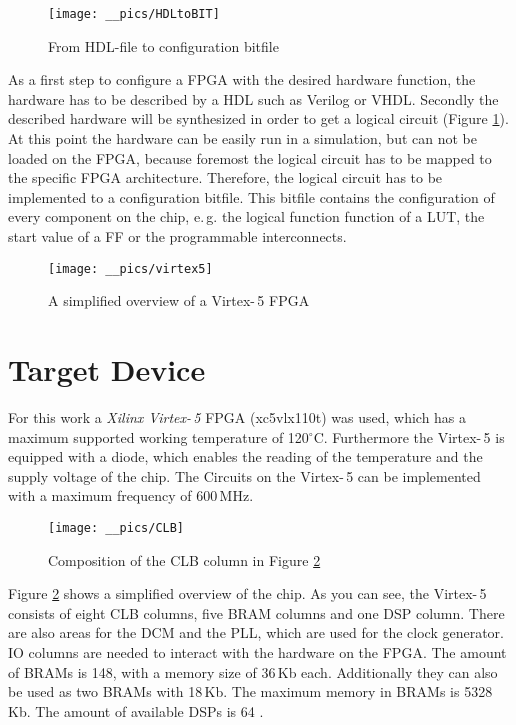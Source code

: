 \begin{figure}[h]
		\texttt{[image: \_\_pics/HDLtoBIT]}
		\caption{From HDL-file to configuration bitfile}
		\label{pic:hdltobit}	
	\end{figure} 

As a first step to configure a \ac{FPGA} with the desired hardware function, the hardware has to be described by a \ac{HDL} such as Verilog or \ac{VHDL}. Secondly the described hardware will be synthesized in order to get a logical circuit (Figure \ref{pic:hdltobit}). At this point the hardware can be easily run in a simulation, but can not be loaded on the \ac{FPGA}, because foremost the logical circuit has to be mapped to the specific \ac{FPGA} architecture. Therefore, the logical circuit has to be implemented to a configuration bitfile. This bitfile contains the configuration of every component on the chip, e.\,g. the logical function function of a \ac{LUT}, the start value of a \ac{FF} or the programmable interconnects.

\begin{figure}[h]
		\texttt{[image: \_\_pics/virtex5]}
		\caption{A simplified overview of a Virtex-\,5 FPGA}
		\label{pic:virtex5}	
	\end{figure} 


\section{Target Device}
\label{sec:target}
For this work a \textit{Xilinx Virtex-\,5} \ac{FPGA} (xc5vlx110t) was used, which has a maximum supported working temperature of 120$^{\circ}$C. Furthermore the Virtex-\,5 is equipped with a diode, which enables the reading of the temperature and the supply voltage of the chip. The Circuits on the Virtex-\,5 can be implemented with a maximum frequency of 600\,MHz.

\begin{figure}[h]
		\texttt{[image: \_\_pics/CLB]}
		\caption{Composition of the CLB column in Figure \ref{pic:virtex5}}
		\label{pic:clb}	
	\end{figure} 

Figure \ref{pic:virtex5} shows a simplified overview of the chip. As you can see, the Virtex-\,5 consists of eight \ac{CLB} columns, five \ac{BRAM} columns and one \ac{DSP} column. There are also areas for the \ac{DCM} and the \ac{PLL}, which are used for the clock generator. \ac{IO} columns are needed to interact with the hardware on the \ac{FPGA}. The amount of \acp{BRAM} is 148, with a memory size of 36\,Kb each. Additionally they can also be used as two \acp{BRAM} with 18\,Kb. The maximum memory in \acp{BRAM} is 5328\,Kb. The amount of available \acp{DSP} is 64 \cite{Description2009}. 


